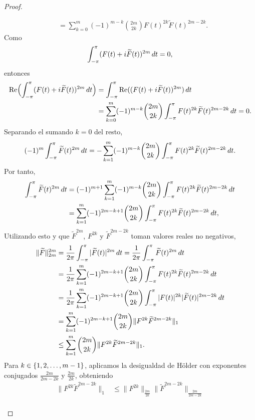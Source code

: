\documentclass[a4paper, 12pt, oneside]{book}
\begin{document}
\begin{proof}
\begin{itemize}
\begin{align*}
            &= \sum_{k=0}^{m}(-1)^{m-k} \binom{2m}{2k}F(t)^{2k}\widetilde{F}(t)^{2m-2k}.
        \end{align*}
        Como
        \[\int_{-\pi}^{\pi} (F(t)+i\widetilde{F}(t))^{2m} \, dt = 0,\]
        entonces
        \begin{align*}
            \textup{Re}\Bigl(\int_{-\pi}^{\pi} (F(t)+i\widetilde{F}(t))^{2m} \, dt\Bigr) &= \int_{-\pi}^{\pi} \textup{Re}((F(t)+i\widetilde{F}(t))^{2m}) \, dt \\ 
            &= \sum_{k=0}^{m}(-1)^{m-k}\binom{2m}{2k}\int_{-\pi}^{\pi} F(t)^{2k}\widetilde{F}(t)^{2m-2k} \, dt = 0.
        \end{align*}
        Separando el sumando $k = 0$ del resto,
        \[(-1)^m\int_{-\pi}^{\pi} \widetilde{F}(t)^{2m} \, dt = -\sum_{k=1}^{m}(-1)^{m-k}\binom{2m}{2k}\int_{-\pi}^{\pi} F(t)^{2k}\widetilde{F}(t)^{2m-2k} \, dt.\]
        Por tanto,
        \begin{align*}
            \int_{-\pi}^{\pi} \widetilde{F}(t)^{2m} \, dt &= (-1)^{m+1}\sum_{k=1}^{m}(-1)^{m-k}\binom{2m}{2k}\int_{-\pi}^{\pi} F(t)^{2k}\widetilde{F}(t)^{2m-2k} \, dt \\
            &= \sum_{k=1}^{m}(-1)^{2m-k+1}\binom{2m}{2k}\int_{-\pi}^{\pi} F(t)^{2k}\widetilde{F}(t)^{2m-2k} \, dt,
        \end{align*}
        Utilizando esto y que $\widetilde{F}^{2m}$, $F^{2k}$ y $\widetilde{F}^{2m-2k}$ toman valores reales no negativos,
        \begin{align*}
            \|\widetilde{F}\|_{2m}^{2m} &= \frac{1}{2\pi}\int_{-\pi}^{\pi} |\widetilde{F}(t)|^{2m} \, dt = \frac{1}{2\pi}\int_{-\pi}^{\pi} \widetilde{F}(t)^{2m} \, dt \\
            &= \frac{1}{2\pi}\sum_{k=1}^{m}(-1)^{2m-k+1}\binom{2m}{2k}\int_{-\pi}^{\pi} F(t)^{2k}\widetilde{F}(t)^{2m-2k} \, dt \\
            &= \frac{1}{2\pi}\sum_{k=1}^{m}(-1)^{2m-k+1}\binom{2m}{2k}\int_{-\pi}^{\pi} |F(t)|^{2k}|\widetilde{F}(t)|^{2m-2k} \, dt \\
            &=\sum_{k=1}^{m}(-1)^{2m-k+1}\binom{2m}{2k}\|F^{2k}\widetilde{F}^{2m-2k}\|_1 \\
            &\leq \sum_{k=1}^{m}\binom{2m}{2k}\|F^{2k}\widetilde{F}^{2m-2k}\|_1.
        \end{align*}
        Para $k\in\{1,2,\mathellipsis,m-1\}$, aplicamos la desigualdad de Hölder con exponentes conjugados $\frac{2m}{2m-2k}$ y $\frac{2m}{2k}$, obteniendo
        \begin{align*}
            \|F^{2k}\widetilde{F}^{2m-2k}\|_1 &\leq \|F^{2k}\|_{\frac{2m}{2k}}\|\widetilde{F}^{2m-2k}\|_{\frac{2m}{2m-2k}} \\

\end{align*}
\end{itemize}
\end{proof}
\end{document}
